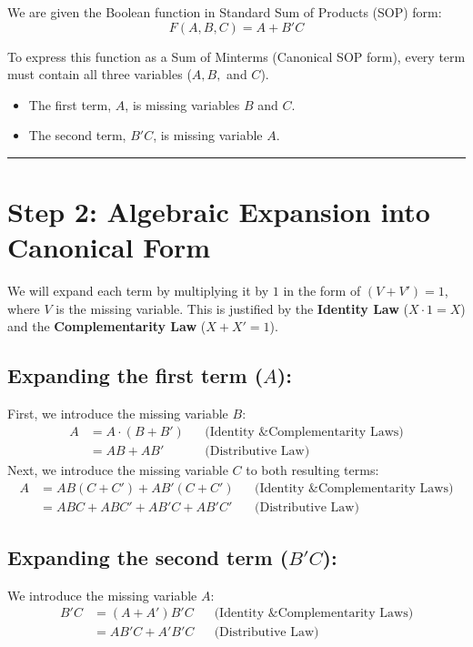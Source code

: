\documentclass[12pt,a3paper]{article}
\begin{document}
\begin{enumerate}
\begin{tcolorbox}[enhanced,breakable,ansbox,colback=cB!4,colframe=cB,boxrule=0.8pt,arc=5pt,title={\textbf{Answer}},fonttitle=\bfseries\color{white},colbacktitle=cB]
We are given the Boolean function in Standard Sum of Products (SOP) form:
\begin{equation*}
    F(A, B, C) = A + B'C
\end{equation*}

To express this function as a Sum of Minterms (Canonical SOP form), every term must contain all three variables ($A, B,$ and $C$). 
\begin{itemize}
    \item The first term, $A$, is missing variables $B$ and $C$.
    \item The second term, $B'C$, is missing variable $A$.
\end{itemize}

\vspace{0.2cm}
\hrule
\vspace{0.4cm}

\section*{Step 2: Algebraic Expansion into Canonical Form}

We will expand each term by multiplying it by $1$ in the form of $(V + V') = 1$, where $V$ is the missing variable. This is justified by the \textbf{Identity Law} ($X \cdot 1 = X$) and the \textbf{Complementarity Law} ($X + X' = 1$).

\subsection*{Expanding the first term ($A$):}
First, we introduce the missing variable $B$:
\begin{align*}
    A &= A \cdot (B + B') && \text{(Identity \& Complementarity Laws)} \\
      &= AB + AB' && \text{(Distributive Law)}
\end{align*}
Next, we introduce the missing variable $C$ to both resulting terms:
\begin{align*}
    A &= AB(C + C') + AB'(C + C') && \text{(Identity \& Complementarity Laws)} \\
      &= ABC + ABC' + AB'C + AB'C' && \text{(Distributive Law)}
\end{align*}

\subsection*{Expanding the second term ($B'C$):}
We introduce the missing variable $A$:
\begin{align*}
    B'C &= (A + A')B'C && \text{(Identity \& Complementarity Laws)} \\
        &= AB'C + A'B'C && \text{(Distributive Law)}
\end{align*}


\end{tcolorbox}
\end{enumerate}
\end{document}
